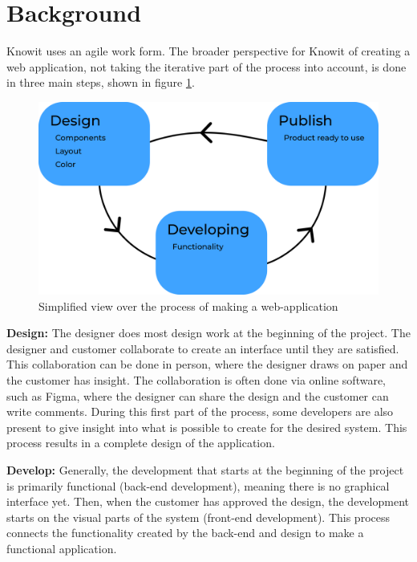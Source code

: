 \newpage
\section{Background}
Knowit uses an agile work form. The broader perspective for Knowit of creating a web application, not taking the iterative part of the process into account, is done in three main steps, shown in figure \ref{fig:ddp}. 

\begin{figure}[H]
  \centering
  \includegraphics[width=0.8\linewidth]{images/ddp.png}
  \caption{Simplified view over the process of making a web-application}%
  \label{fig:ddp}
\end{figure}


\textbf{Design:} The designer does most design work at the beginning of the project. The designer and customer collaborate to create an interface until they are satisfied. This collaboration can be done in person, where the designer draws on paper and the customer has insight. The collaboration is often done via online software, such as Figma\cite{FigmaCollaborativeInterface}, where the designer can share the design and the customer can write comments. During this first part of the process, some developers are also present to give insight into what is possible to create for the desired system. This process results in a complete design of the application. 

\textbf{Develop:} Generally, the development that starts at the beginning of the project is primarily functional (back-end development), meaning there is no graphical interface yet. Then, when the customer has approved the design, the development starts on the visual parts of the system (front-end development). This process connects the functionality created by the back-end and design to make a functional application.

